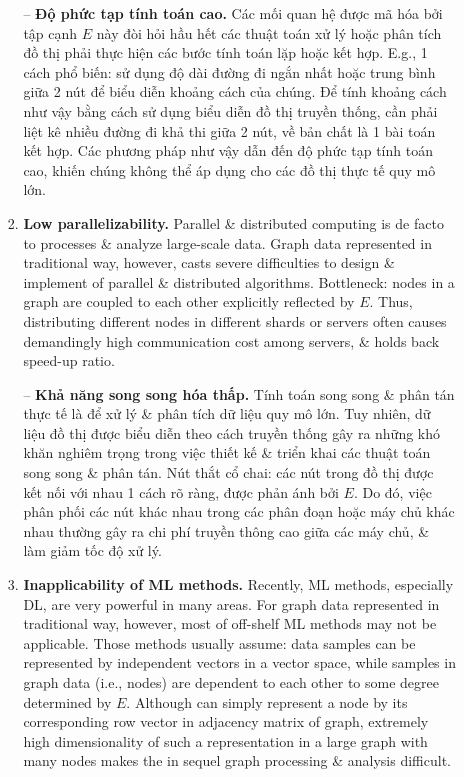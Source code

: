 \documentclass{article}
\begin{document}
\begin{itemize}
\begin{itemize}
\begin{enumerate}
            -- {\bf Độ phức tạp tính toán cao.} Các mối quan hệ được mã hóa bởi tập cạnh $E$ này đòi hỏi hầu hết các thuật toán xử lý hoặc phân tích đồ thị phải thực hiện các bước tính toán lặp hoặc kết hợp. E.g., 1 cách phổ biến: sử dụng độ dài đường đi ngắn nhất hoặc trung bình giữa 2 nút để biểu diễn khoảng cách của chúng. Để tính khoảng cách như vậy bằng cách sử dụng biểu diễn đồ thị truyền thống, cần phải liệt kê nhiều đường đi khả thi giữa 2 nút, về bản chất là 1 bài toán kết hợp. Các phương pháp như vậy dẫn đến độ phức tạp tính toán cao, khiến chúng không thể áp dụng cho các đồ thị thực tế quy mô lớn.
            \item {\bf Low parallelizability.} Parallel \& distributed computing is de facto to processes \& analyze large-scale data. Graph data represented in traditional way, however, casts severe difficulties to design \& implement of parallel \& distributed algorithms. Bottleneck: nodes in a graph are coupled to each other explicitly reflected by $E$. Thus, distributing different nodes in different shards or servers often causes demandingly high communication cost among servers, \& holds back speed-up ratio.

            -- {\bf Khả năng song song hóa thấp.} Tính toán song song \& phân tán thực tế là để xử lý \& phân tích dữ liệu quy mô lớn. Tuy nhiên, dữ liệu đồ thị được biểu diễn theo cách truyền thống gây ra những khó khăn nghiêm trọng trong việc thiết kế \& triển khai các thuật toán song song \& phân tán. Nút thắt cổ chai: các nút trong đồ thị được kết nối với nhau 1 cách rõ ràng, được phản ánh bởi $E$. Do đó, việc phân phối các nút khác nhau trong các phân đoạn hoặc máy chủ khác nhau thường gây ra chi phí truyền thông cao giữa các máy chủ, \& làm giảm tốc độ xử lý.
            \item {\bf Inapplicability of ML methods.} Recently, ML methods, especially DL, are very powerful in many areas. For graph data represented in traditional way, however, most of off-shelf ML methods may not be applicable. Those methods usually assume: data samples can be represented by independent vectors in a vector space, while samples in graph data (i.e., nodes) are dependent to each other to some degree determined by $E$. Although can simply represent a node by its corresponding row vector in adjacency matrix of graph, extremely high dimensionality of such a representation in a large graph with many nodes makes the in sequel graph processing \& analysis difficult.


\end{enumerate}
\end{itemize}
\end{itemize}
\end{document}
